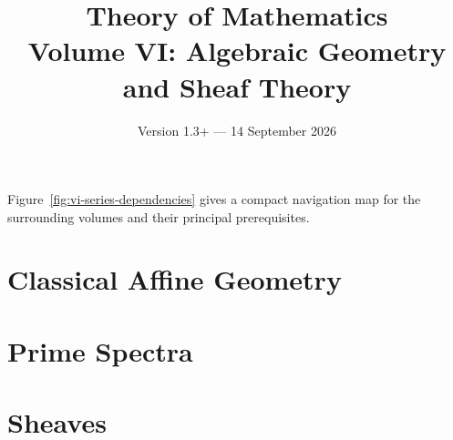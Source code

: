 \documentclass[11pt,a4paper,oneside,openany]{book}
\title{Theory of Mathematics\\[0.5em]\Large Volume VI: Algebraic Geometry and Sheaf Theory}
\author{}
\date{Version 1.3+ --- 14 September 2026}
\begin{document}
\maketitle
\clearpage

\frontmatter
\tableofcontents


Figure~\ref{fig:vi-series-dependencies} gives a compact navigation map for the
surrounding volumes and their principal prerequisites.



% 

\mainmatter

\part{Classical Affine Geometry}






\part{Prime Spectra}







\part{Sheaves}






\end{document}

